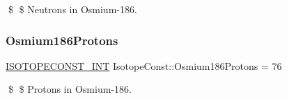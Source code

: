 \$ \$ Neutrons in Osmium-\/186. \mbox{\label{group___isotope_const-_osmium-_os186_ga26fcc724a4f508520c72fe0e0c421fe0}} 
\subsubsection{\texorpdfstring{Osmium186\+Protons}{Osmium186Protons}}
{\footnotesize\ttfamily \mbox{\hyperlink{group___isotope_const-_macros_ga5f18360b3e99483a35c32d789e62621c}{I\+S\+O\+T\+O\+P\+E\+C\+O\+N\+S\+T\+\_\+\+I\+NT}} Isotope\+Const\+::\+Osmium186\+Protons = 76}

\$ \$ Protons in Osmium-\/186. 